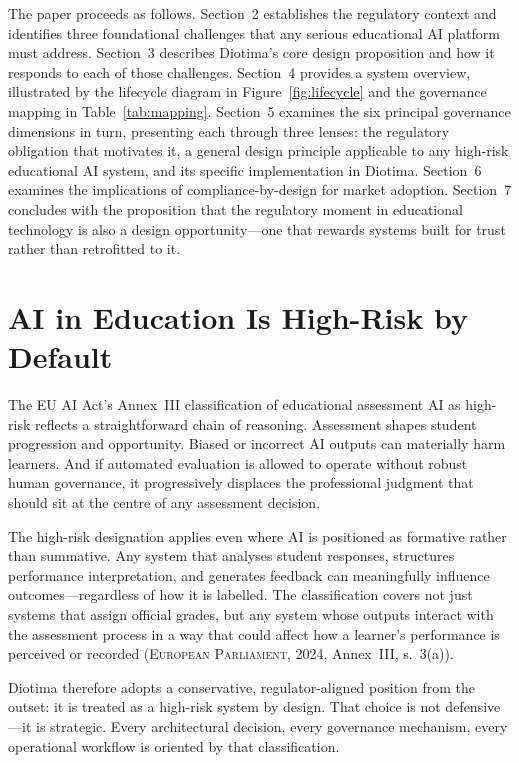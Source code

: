 \documentclass[10pt, a4paper, twocolumn]{article}
\begin{document}
The paper proceeds as follows. Section~2 establishes the regulatory context and
identifies three foundational challenges that any serious educational AI platform must
address. Section~3 describes Diotima's core design proposition and how it responds to
each of those challenges. Section~4 provides a system overview, illustrated by the lifecycle
diagram in Figure~\ref{fig:lifecycle} and the governance mapping in Table~\ref{tab:mapping}. Section~5 examines the six principal
governance dimensions in turn, presenting each through three lenses: the regulatory
obligation that motivates it, a general design principle applicable to any high-risk
educational AI system, and its specific implementation in Diotima. Section~6 examines
the implications of compliance-by-design for market adoption. Section~7 concludes with
the proposition that the regulatory moment in educational technology is also a design
opportunity---one that rewards systems built for trust rather than retrofitted to it.

\section{AI in Education Is High-Risk by Default}

The EU AI Act's Annex~III classification of educational assessment AI as high-risk
reflects a straightforward chain of reasoning. Assessment shapes student progression
and opportunity. Biased or incorrect AI outputs can materially harm learners. And if
automated evaluation is allowed to operate without robust human governance, it
progressively displaces the professional judgment that should sit at the centre of any
assessment decision.

The high-risk designation applies even where AI is positioned as formative rather than
summative. Any system that analyses student responses, structures performance
interpretation, and generates feedback can meaningfully influence outcomes---regardless
of how it is labelled. The classification covers not just systems that assign official
grades, but any system whose outputs interact with the assessment process in a way that
could affect how a learner's performance is perceived or recorded (\textsc{European
Parliament}, 2024, Annex~III, s.~3(a)).

Diotima therefore adopts a conservative, regulator-aligned position from the outset: it
is treated as a high-risk system by design. That choice is not defensive---it is
strategic. Every architectural decision, every governance mechanism, every operational
workflow is oriented by that classification.
\end{document}
